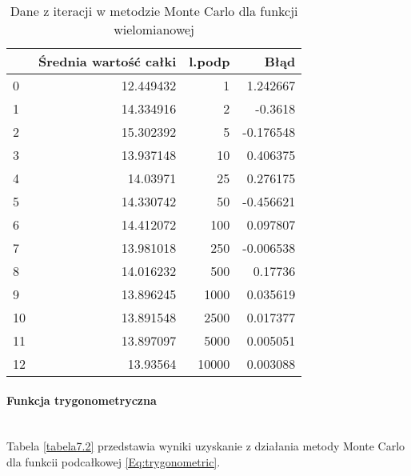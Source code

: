\documentclass[12pt,twoside]{article}
\begin{document}
\begin{table}[H]
\centering 
\caption{Dane z iteracji w metodzie Monte Carlo dla funkcji wielomianowej}
\label{tabela7.1}
\begin{tabular}{lrrr}
\toprule
{} &  Średnia wartość całki &  l.podp &      Błąd \\
\midrule
0  &              12.449432 &       1 &  1.242667 \\
1  &              14.334916 &       2 & -0.3618 \\
2  &              15.302392 &       5 & -0.176548 \\
3  &              13.937148 &      10 &  0.406375 \\
4  &               14.03971 &      25 &  0.276175 \\
5  &              14.330742 &      50 & -0.456621 \\
6  &              14.412072 &     100 &  0.097807 \\
7  &              13.981018 &     250 & -0.006538 \\
8  &              14.016232 &     500 &  0.17736 \\
9  &              13.896245 &    1000 &  0.035619 \\
10 &              13.891548 &    2500 &  0.017377 \\
11 &              13.897097 &    5000 &  0.005051 \\
12 &               13.93564 &   10000 &  0.003088 \\
\bottomrule
\end{tabular}
\end{table}

\paragraph{Funkcja trygonometryczna}\mbox{} \\

Tabela \eqref{tabela7.2} przedstawia wyniki uzyskanie z działania metody Monte Carlo dla funkcii podcałkowej \eqref{Eq:trygonometric}.
\end{document}
